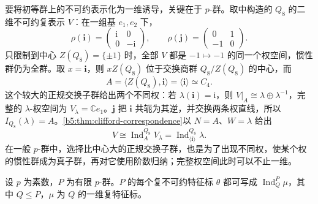 要将初等群上的不可约表示化为一维诱导，关键在于 \(p\)-群。取中构造的 \(Q_8\) 的二维不可约复表示 \(V\)：在一组基 \(e_1,e_2\) 下，
\[
	\rho(\mathbf i)=\begin{pmatrix}\mathrm i&0\\0&-\mathrm i\end{pmatrix},\qquad
	\rho(\mathbf j)=\begin{pmatrix}0&1\\-1&0\end{pmatrix}.
\]
只限制到中心 \(Z(Q_8)=\{\pm1\}\) 时，全部 \(V\) 都是 \(-1\mapsto-1\) 的同一个权空间，惯性群仍为全群。取 \(x=\mathbf i\)，则 \(xZ(Q_8)\) 位于交换商群 \(Q_8/Z(Q_8)\) 的中心，而
\[
	A=\langle Z(Q_8),\mathbf i\rangle=\langle\mathbf i\rangle\simeq C_4.
\]
这个较大的正规交换子群给出两个不同权：若 \(\lambda(\mathbf i)=\mathrm i\)，则 \(V|_A\cong\lambda\oplus\lambda^{-1}\)，完整的 \(\lambda\)-权空间为 \(V_\lambda=\mathbb Ce_1\)。\(\mathbf j\) 把 \(\mathbf i\) 共轭为其逆，并交换两条权直线，所以 \(I_{Q_8}(\lambda)=A\)。\cref{b5:thm:clifford-correspondence}以 \(N=A\)、\(W=\lambda\) 给出
\[
	V\cong\operatorname{Ind}_A^{Q_8}V_\lambda =\operatorname{Ind}_{\langle\mathbf i\rangle}^{Q_8}\lambda.
\]
在一般 \(p\)-群中，选择比中心大的正规交换子群，也是为了出现不同权，使某个权的惯性群成为真子群，再对它使用阶数归纳；完整权空间此时可以不止一维。
\begin{theorem}\label{b5:thm:p-group-monomial}
	设 \(p\) 为素数，\(P\) 为有限 \(p\)-群。\(P\) 的每个复不可约特征标 \(\theta\) 都可写成 \(\operatorname{Ind}_Q^P\mu\)，其中 \(Q\le P\)，\(\mu\) 为 \(Q\) 的一维复特征标。
\end{theorem}
